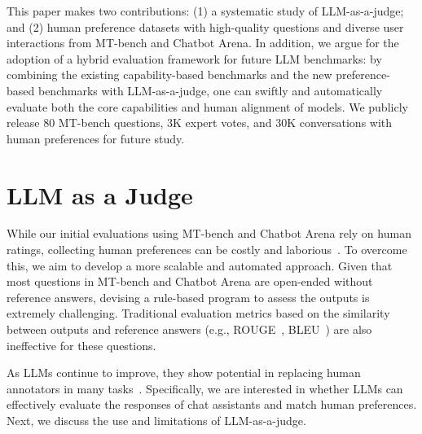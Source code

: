 This paper makes two contributions: (1) a systematic study of LLM-as-a-judge; and (2) human preference datasets with high-quality questions and diverse user interactions from MT-bench and Chatbot Arena.
In addition, we argue for the adoption of a hybrid evaluation framework for future LLM benchmarks: by combining the existing capability-based benchmarks and the new preference-based benchmarks with LLM-as-a-judge, one can swiftly and automatically evaluate both the core capabilities and human alignment of models.
We publicly release 80 MT-bench questions, 3K expert votes, and 30K conversations with human preferences for future study.






























\section{LLM as a Judge}
\label{sec:llm-as-a-judge}
While our initial evaluations using MT-bench and Chatbot Arena rely on human ratings, collecting human preferences can be costly and laborious~\cite{selfinstruct,alpaca,ouyang2022training,bai2022training,diao2023lmflow}. To overcome this, we aim to develop a more scalable and automated approach. Given that most questions in MT-bench and Chatbot Arena are open-ended without reference answers, devising a rule-based program to assess the outputs is extremely challenging.
Traditional evaluation metrics based on the similarity between outputs and reference answers (e.g., ROUGE~\cite{lin2004rouge}, BLEU~\cite{papineni2002bleu}) are also ineffective for these questions.

As LLMs continue to improve, they show potential in replacing human annotators in many tasks~\cite{gilardi2023chatgpt,huang2023chatgpt}. Specifically, we are interested in whether LLMs can effectively evaluate the responses of chat assistants and match human preferences. Next, we discuss the use and limitations of LLM-as-a-judge.

